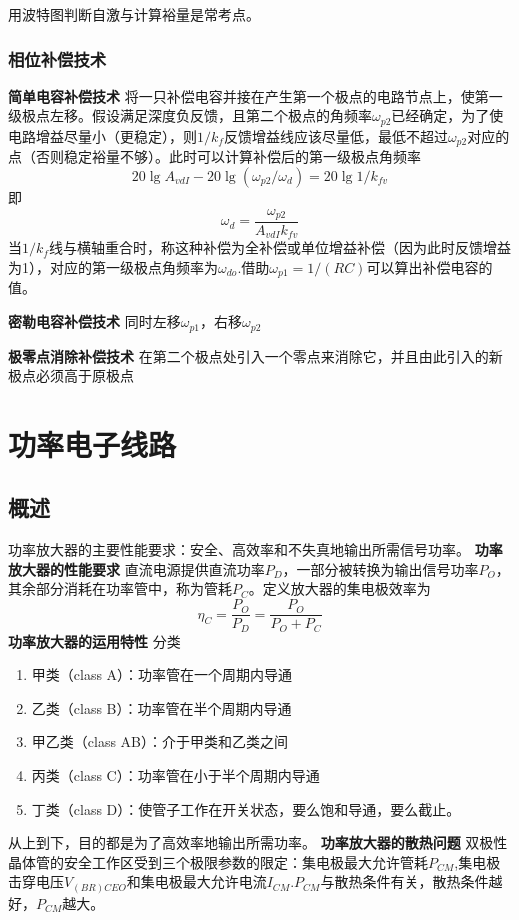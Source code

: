 \documentclass{ctexart}
\newcommand*{\noindbfquad}[1]{{\noindent \bf{#1} \qquad}}
\begin{document}
用波特图判断自激与计算裕量是常考点。
\subsubsection{相位补偿技术}
\noindbfquad{简单电容补偿技术}
将一只补偿电容并接在产生第一个极点的电路节点上，使第一级极点左移。假设满足深度负反馈，且第二个极点的角频率$\omega_{p2}$已经确定，为了使电路增益尽量小（更稳定），则$1/k_f$反馈增益线应该尽量低，最低不超过$\omega_{p2}$对应的点（否则稳定裕量不够）。此时可以计算补偿后的第一级极点角频率
\begin{equation}
    20\lg A_{vdI}-20\lg (\omega_{p2}/\omega_{d})=20\lg 1/k_{fv}
\end{equation}
即
\begin{equation}
    \omega_d=\dfrac{\omega_{p2}}{A_{vdI}k_{fv}}
\end{equation}
当$1/k_f$线与横轴重合时，称这种补偿为全补偿或单位增益补偿（因为此时反馈增益为1），对应的第一级极点角频率为$\omega_{do}$.借助$\omega_{p1}=1/(RC)$可以算出补偿电容的值。

\noindbfquad{密勒电容补偿技术}同时左移$\omega_{p1}$，右移$\omega_{p2}$

\noindbfquad{极零点消除补偿技术}在第二个极点处引入一个零点来消除它，并且由此引入的新极点必须高于原极点
\section{功率电子线路}
\subsection{概述}
功率放大器的主要性能要求：安全、高效率和不失真地输出所需信号功率。
\noindbfquad{功率放大器的性能要求}直流电源提供直流功率$P_D$，一部分被转换为输出信号功率$P_O$，其余部分消耗在功率管中，称为管耗$P_C$。定义放大器的集电极效率为
\begin{equation}
    \eta_C=\dfrac{P_O}{P_D}=\dfrac{P_O}{P_O+P_C}
\end{equation}
\noindbfquad{功率放大器的运用特性}
分类
\begin{enumerate}
    \item 甲类（class A）：功率管在一个周期内导通
    \item 乙类（class B）：功率管在半个周期内导通
    \item 甲乙类（class AB）：介于甲类和乙类之间
    \item 丙类（class C）：功率管在小于半个周期内导通
    \item 丁类（class D）：使管子工作在开关状态，要么饱和导通，要么截止。
\end{enumerate}
从上到下，目的都是为了高效率地输出所需功率。
\noindbfquad{功率放大器的散热问题}
双极性晶体管的安全工作区受到三个极限参数的限定：集电极最大允许管耗$P_{CM}$,集电极击穿电压$V_{(BR)CEO}$和集电极最大允许电流$I_{CM}$.$P_{CM}$与散热条件有关，散热条件越好，$P_{CM}$越大。
\end{document}
